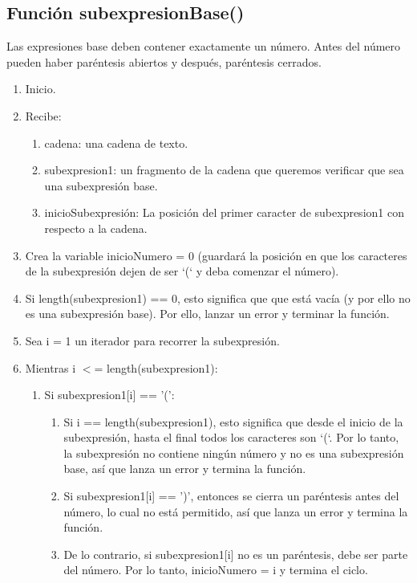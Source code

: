 \documentclass{article}
\begin{document}
\subsection{Función subexpresionBase()}
\normalsize Las expresiones base deben contener exactamente un número. Antes del número pueden haber paréntesis abiertos y después, paréntesis cerrados.
\begin{enumerate}
    \item Inicio.
    \item Recibe:
    \begin{enumerate}
        \item cadena: una cadena de texto.
        \item subexpresion1: un fragmento de la cadena que queremos verificar que sea una subexpresión base.
        \item inicioSubexpresión: La posición del primer caracter de subexpresion1  con respecto a la cadena.
    \end{enumerate}
    \item Crea la variable inicioNumero = 0 (guardará la posición en que los caracteres de la subexpresión dejen de ser ‘(‘ y deba comenzar el número).
    \item Si length(subexpresion1) == 0, esto significa que que está vacía (y por ello no es una subexpresión base). Por ello, lanzar un error y terminar la función.
    \item Sea i = 1 un iterador para recorrer la subexpresión.
    \item Mientras i $<$= length(subexpresion1):
    \begin{enumerate}
        \item Si subexpresion1[i] == '(':
        \begin{enumerate}
            \item Si i == length(subexpresion1), esto significa que desde el inicio de la subexpresión, hasta el final todos los caracteres son ‘(‘. Por lo tanto, la subexpresión no contiene ningún número y no es una subexpresión base, así que lanza un error y termina la función.
            \item Si subexpresion1[i] == ')', entonces se cierra un paréntesis antes del número, lo cual no está permitido, así que lanza un error y termina la función.
            \item De lo contrario, si  subexpresion1[i] no es un paréntesis, debe ser parte del número. Por lo tanto, inicioNumero = i y termina el ciclo.
        \end{enumerate}

\end{enumerate}
\end{enumerate}
\end{document}
